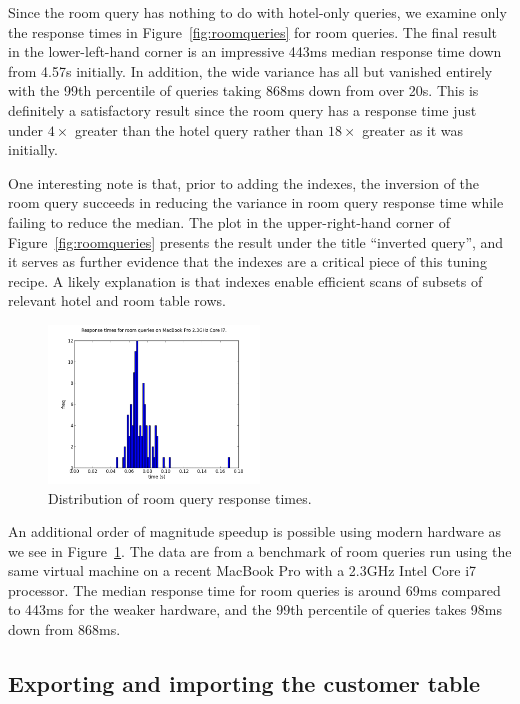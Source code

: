 \documentclass[letterpaper]{article}%
\begin{document}
Since the room query has nothing to do with hotel-only queries, we examine only
the response times in Figure~\ref{fig:roomqueries} for room queries. The final
result in the lower-left-hand corner is an impressive 443ms median response
time down from 4.57s initially. In addition, the wide variance has all but
vanished entirely with the 99th percentile of queries taking 868ms down from
over 20s.  This is definitely a satisfactory result since the room query has a
response time just under $4\times$ greater than the hotel query rather than
$18\times$ greater as it was initially.

One interesting note is that, prior to adding the indexes, the inversion of the
room query succeeds in reducing the variance in room query response time while
failing to reduce the median. The plot in the upper-right-hand corner of
Figure~\ref{fig:roomqueries} presents the result under the title ``inverted
query'', and it serves as further evidence that the indexes are a critical
piece of this tuning recipe. A likely explanation is that indexes enable
efficient scans of subsets of relevant hotel and room table rows.

\begin{figure}[h!]
  \centering
  \includegraphics[width=0.5\textwidth]{../ReserveWithUsApp/benchmark_data/room_times_mbp.png}
  \caption{Distribution of room query response times.}
  \label{fig:roomqueriesmbp}
\end{figure}

An additional order of magnitude speedup is possible using modern hardware as
we see in Figure~\ref{fig:roomqueriesmbp}. The data are from a benchmark of
room queries run using the same virtual machine on a recent MacBook Pro with a
2.3GHz Intel Core i7 processor. The median response time for room queries is
around 69ms compared to 443ms for the weaker hardware, and the 99th percentile
of queries takes 98ms down from 868ms.

\subsection{Exporting and importing the customer table}
\end{document}
